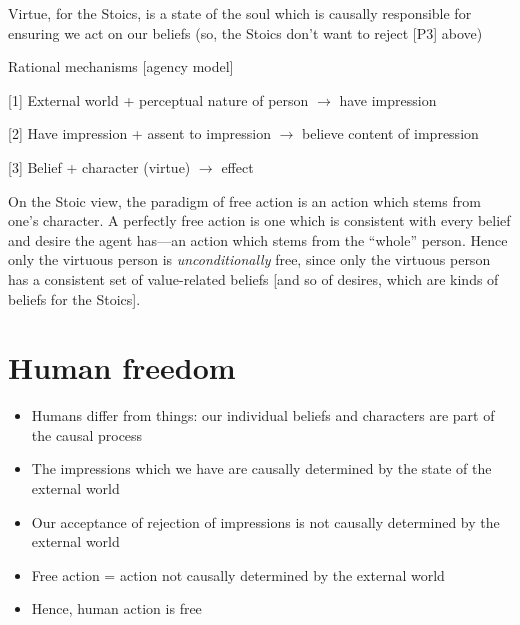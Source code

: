 \documentclass[11pt]{article}
\begin{document}
\noindent Virtue, for the Stoics, is a state of the soul which is causally responsible for ensuring we act on our beliefs (so, the Stoics don't want to reject [P3] above)
\vspace*{2mm}




\noindent Rational mechanisms [agency model]
\vspace*{1mm}

\hspace*{5mm} [1] External world + perceptual nature of person $\rightarrow$ have impression
\vspace*{1mm}

\hspace*{5mm} [2] Have impression + assent to impression $\rightarrow$ believe content of impression
\vspace*{1mm}

\hspace*{5mm} [3] Belief + character (virtue) $\rightarrow$ effect
\vspace*{2mm}

\noindent  On the Stoic view, the paradigm of free action is an action which stems from one's character. A perfectly free action is one which is consistent with every belief and desire the agent has---an action which stems from the ``whole'' person. Hence only the virtuous person is \emph{unconditionally} free, since only the virtuous person has a consistent set of value-related beliefs [and so of desires, which are kinds of beliefs for the Stoics].
\vspace*{2mm}

\section*{Human freedom}

\begin{itemize}
\item Humans differ from things: our individual beliefs and characters are part of the causal process
\item The impressions which we have are causally determined by the state of the external world
\item Our acceptance of rejection of impressions is not causally determined by the external world
\item Free action = action not causally determined by the external world
\item Hence, human action is free
\end{itemize}
\end{document}
